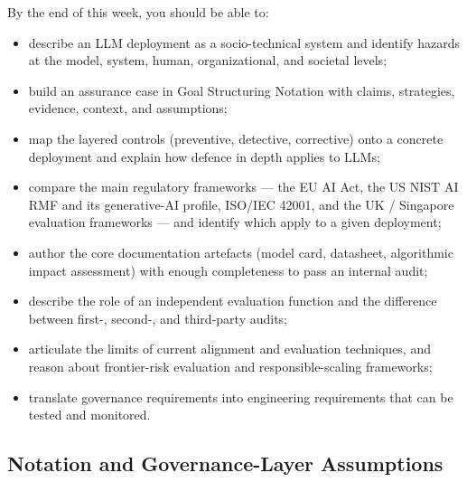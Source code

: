 By the end of this week, you should be able to:
\begin{itemize}
  \item describe an LLM deployment as a socio-technical system
        and identify hazards at the model, system, human,
        organizational, and societal levels;
  \item build an assurance case in Goal Structuring Notation
        with claims, strategies, evidence, context, and
        assumptions;
  \item map the layered controls (preventive, detective,
        corrective) onto a concrete deployment and explain how
        defence in depth applies to LLMs;
  \item compare the main regulatory frameworks --- the EU AI Act,
        the US NIST AI RMF and its generative-AI profile, ISO/IEC
        42001, and the UK / Singapore evaluation frameworks ---
        and identify which apply to a given deployment;
  \item author the core documentation artefacts (model card,
        datasheet, algorithmic impact assessment) with enough
        completeness to pass an internal audit;
  \item describe the role of an independent evaluation function
        and the difference between first-, second-, and
        third-party audits;
  \item articulate the limits of current alignment and evaluation
        techniques, and reason about frontier-risk evaluation
        and responsible-scaling frameworks;
  \item translate governance requirements into engineering
        requirements that can be tested and monitored.
\end{itemize}

\subsection{Notation and Governance-Layer Assumptions}
\label{sec:wk10_notation}

